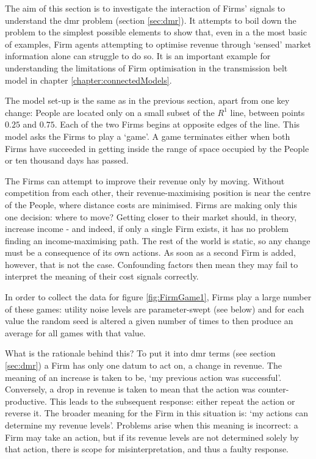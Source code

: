The aim of this section is to investigate the interaction of Firms' signals to understand the \gls{dmr} problem (section \ref{sec:dmr}). It attempts to boil down the problem to the simplest possible elements to show that, even in a the most basic of examples, Firm agents attempting to optimise revenue through `sensed' market information alone can struggle to do so. It is an important example for understanding the limitations of Firm optimisation in the transmission belt model in chapter \ref{chapter:connectedModels}.

The model set-up is the same as in the previous section, apart from one key change: People are located only on a small subset of the $R^1$ line, between points $0.25$ and $0.75$. Each of the two Firms begins at opposite edges of the line. This model asks the Firms to play a `game'. A game terminates either when both Firms have succeeded in getting inside the range of space occupied by the People or ten thousand days has passed. 

The Firms can attempt to improve their revenue only by moving. Without competition from each other, their revenue-maximising position is near the centre of the People, where distance costs are minimised. Firms are making only this one decision: where to move? Getting closer to their market should, in theory, increase income - and indeed, if only a single Firm exists, it has no problem finding an income-maximising path. The rest of the world is static, so any change must be a consequence of its own actions. As soon as a second Firm is added, however, that is not the case. Confounding factors then mean they may fail to interpret the meaning of their cost signals correctly. 

In order to collect the data for figure \ref{fig:FirmGame1},  Firms play a large number of these games: utility noise levels are parameter-swept (see below) and for each value the random seed is altered a given number of times to then produce an average for all games with that value.

What is the rationale behind this? To put it into \gls{dmr} terms (see section \ref{sec:dmr}) a Firm has only one datum to act on, a change in revenue. The meaning of an increase is taken to be, `my previous action was successful'. Conversely, a drop in revenue is taken to mean that the action was counter-productive. This leads to the subsequent response: either repeat the action or reverse it. The broader meaning for the Firm in this situation is: `my actions can determine my revenue levels'. Problems arise when this meaning is incorrect: a Firm may take an action, but if its revenue levels are not determined solely by that action, there is scope for misinterpretation, and thus a faulty response. 

